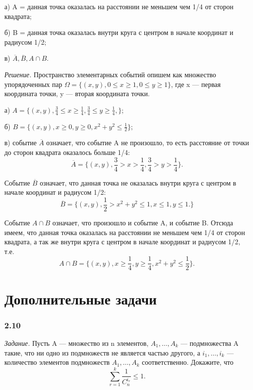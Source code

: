 \documentclass{book}
\begin{document}
а) A = {данная точка оказалась на расстоянии не меньшем чем 1/4 от сторон квадрата};

б) B = {данная точка оказалась внутри круга с центром в начале координат и радиусом 1/2};

в) $ \overline{ A }, \overline{ B }, A \cap B $.

\textit{Решение.} Пространство элементарных событий опишем как множество упорядоченных пар
$ \Omega = \{ (x, y), 0 \leq x \geq 1, 0 \leq y \geq 1 \} $, где x --- первая координата точки, y --- вторая координата точки.

а) $ A = \{ (x, y), \frac{3}{4} \leq x \geq \frac{1}{4}, \frac{3}{4} \leq y \geq \frac{1}{4}, \} $;

б) $ B = \{ (x, y), x \geq 0, y \geq 0, x^2 + y^2 \leq \frac{1}{2} \} $;

в) событие $ \overline{ A } $ означает, что событие A не произошло, то есть расстояние от точки до сторон квадрата оказалось больше 1/4:
$$ \overline{ A } =
\{ (x, y), \frac{3}{4} > x > \frac{1}{4},
\frac{3}{4} > y > \frac{1}{4} \}.$$

Событие $ \overline{ B } $ означает, что данная точка не оказалась внутри круга с центром в начале координат и радиусом 1/2:
$$ \overline{ B } =
\{ (x, y),
\frac{1}{2} > x^2 + y^2 \leq 1,
x \leq 1,
y \leq 1. \} $$

Событие $ A \cap B $ означает, что произошло и событие A, и событие B.
Отсюда имеем, что данная точка оказалась на расстоянии не меньшем чем 1/4 от сторон квадрата, а так же внутри круга с центром в начале координат и радиусом 1/2, т.е.
$$ A \cap B =
\{ (x, y),
x \geq \frac{1}{4},
y \geq \frac{1}{4},
x^2 + y^2 \leq \frac{1}{2} \}.$$

\section*{Дополнительные задачи}

\subsubsection*{2.10}

\textit{Задание.} Пусть A --- множество из n элементов,
$ A_1,  \dotsc , A_k $ --- подмножества A такие, что ни одно из подмножеств не является частью другого,
а $ i_1,  \dotsc , i_k $ --- количество элементов подмножеств $ A_1,  \dotsc , A_k $ соответственно.
Докажите, что
$$ \sum \limits_{ r = 1 }^k \frac{ 1 }{ C_n^{ i_r } } \leq 1.$$
\end{document}
